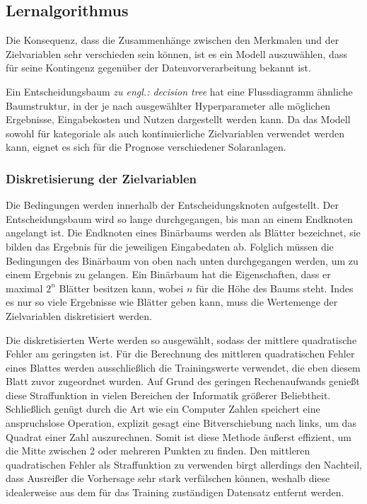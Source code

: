 \documentclass[12pt, a4paper]{article}
\begin{document}
\subsection{Lernalgorithmus}

Die Konsequenz, dass die Zusammenhänge zwischen den Merkmalen und der Zielvariablen sehr verschieden sein können, ist es ein Modell auszuwählen, dass für seine Kontingenz gegenüber der Datenvorverarbeitung bekannt ist. 

Ein Entscheidungsbaum \textit{zu engl.: decision tree} hat eine Flussdiagramm ähnliche Baumstruktur, in der je nach ausgewählter Hyperparameter alle möglichen Ergebnisse, Eingabekosten und Nutzen dargestellt werden kann. Da das Modell sowohl für kategoriale als auch kontinuierliche Zielvariablen verwendet werden kann, eignet es sich für die Prognose verschiedener Solaranlagen. 

\subsubsection{Diskretisierung der Zielvariablen}

Die Bedingungen werden innerhalb der Entscheidungsknoten aufgestellt. Der Entscheidungsbaum wird so lange durchgegangen, bis man an einem Endknoten angelangt ist. Die Endknoten eines Binärbaums werden als Blätter bezeichnet, sie bilden das Ergebnis für die jeweiligen Eingabedaten ab. Folglich müssen die Bedingungen des Binärbaum von oben nach unten durchgegangen werden, um zu einem Ergebnis zu gelangen. Ein Binärbaum hat die Eigenschaften, dass er maximal $2^{n}$ Blätter besitzen kann, wobei $n$ für die Höhe des Baums steht. Indes es nur so viele Ergebnisse wie Blätter geben kann, muss die Wertemenge der Zielvariablen diskretisiert werden. 

Die diskretisierten Werte werden so ausgewählt, sodass der mittlere quadratische Fehler am geringsten ist. Für die Berechnung des mittleren quadratischen Fehler eines Blattes werden ausschließlich die Trainingswerte verwendet, die eben diesem Blatt zuvor zugeordnet wurden. Auf Grund des geringen Rechenaufwands genießt diese Straffunktion in vielen Bereichen der Informatik größerer Beliebtheit. Schließlich genügt durch die Art wie ein Computer Zahlen speichert eine anspruchslose Operation, explizit gesagt eine Bitverschiebung nach links, um das Quadrat einer Zahl auszurechnen. Somit ist diese Methode äußerst effizient, um die Mitte zwischen 2 oder mehreren Punkten zu finden. Den mittleren quadratischen Fehler als Straffunktion zu verwenden birgt allerdings den Nachteil, dass Ausreißer die Vorhersage sehr stark verfälschen können, weshalb diese idealerweise aus dem für das Training zuständigen Datensatz entfernt werden.
\end{document}
